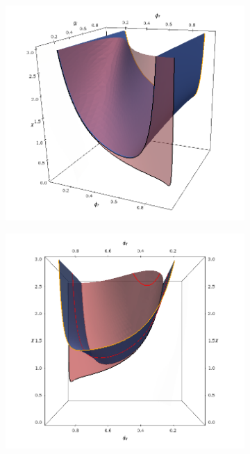 \documentclass[12pt]{extarticle}
\begin{document}
\begin{figure}[h!]
	\vspace{-20mm}
	\hspace{-15mm}
	\begin{subfigure}{0.45\textwidth}
		\hspace{-10mm}
		\includegraphics[scale=0.36]{images/stab3}
		\caption{}
	\end{subfigure}
	\hspace{30mm}
	\begin{subfigure}{0.53\textwidth}
		\hspace{-20mm}
		\includegraphics[scale=0.38]{images/stab4}

\end{subfigure}
\end{figure}
\end{document}
